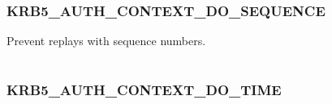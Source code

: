 \documentclass[letterpaper,10pt,english]{sphinxmanual}
\begin{document}
\begin{fulllineitems}
\label{appdev/refs/macros/KRB5_AUTHDATA_WIN2K_PAC:KRB5_AUTHDATA_WIN2K_PAC}
\end{fulllineitems}


\begin{tabulary}{\linewidth}{|L|L|}
\hline

 & 
\\
\hline\end{tabulary}



\subsubsection{KRB5\_AUTH\_CONTEXT\_DO\_SEQUENCE}
\label{appdev/refs/macros/KRB5_AUTH_CONTEXT_DO_SEQUENCE:krb5-auth-context-do-sequence-data}\label{appdev/refs/macros/KRB5_AUTH_CONTEXT_DO_SEQUENCE:krb5-auth-context-do-sequence}\label{appdev/refs/macros/KRB5_AUTH_CONTEXT_DO_SEQUENCE::doc}

\begin{fulllineitems}
\label{appdev/refs/macros/KRB5_AUTH_CONTEXT_DO_SEQUENCE:KRB5_AUTH_CONTEXT_DO_SEQUENCE}
\end{fulllineitems}


Prevent replays with sequence numbers.

\begin{tabulary}{\linewidth}{|L|L|}
\hline

 & 
\\
\hline\end{tabulary}



\subsubsection{KRB5\_AUTH\_CONTEXT\_DO\_TIME}
\label{appdev/refs/macros/KRB5_AUTH_CONTEXT_DO_TIME:krb5-auth-context-do-time-data}\label{appdev/refs/macros/KRB5_AUTH_CONTEXT_DO_TIME:krb5-auth-context-do-time}\label{appdev/refs/macros/KRB5_AUTH_CONTEXT_DO_TIME::doc}

\begin{fulllineitems}
\label{appdev/refs/macros/KRB5_AUTH_CONTEXT_DO_TIME:KRB5_AUTH_CONTEXT_DO_TIME}
\end{fulllineitems}
\end{document}
